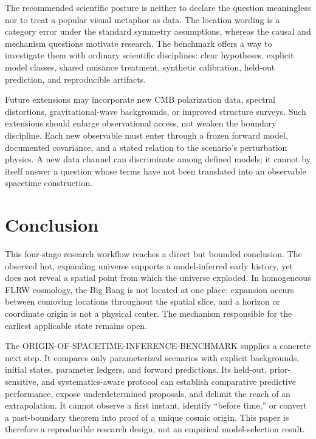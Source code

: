 \documentclass[10pt,conference]{IEEEtran}
\begin{document}
The recommended scientific posture is neither to declare the question meaningless nor to treat a popular visual metaphor as data. The location wording is a category error under the standard symmetry assumptions, whereas the causal and mechanism questions motivate research. The benchmark offers a way to investigate them with ordinary scientific disciplines: clear hypotheses, explicit model classes, shared nuisance treatment, synthetic calibration, held-out prediction, and reproducible artifacts.

Future extensions may incorporate new CMB polarization data, spectral distortions, gravitational-wave backgrounds, or improved structure surveys. Such extensions should enlarge observational access, not weaken the boundary discipline. Each new observable must enter through a frozen forward model, documented covariance, and a stated relation to the scenario's perturbation physics. A new data channel can discriminate among defined models; it cannot by itself answer a question whose terms have not been translated into an observable spacetime construction.

\section{Conclusion}
\label{sec:conclusion}

This four-stage research workflow reaches a direct but bounded conclusion. The observed hot, expanding universe supports a model-inferred early history, yet does not reveal a spatial point from which the universe exploded. In homogeneous FLRW cosmology, the Big Bang is not located at one place: expansion occurs between comoving locations throughout the spatial slice, and a horizon or coordinate origin is not a physical center. The mechanism responsible for the earliest applicable state remains open.

The ORIGIN-OF-SPACETIME-INFERENCE-BENCHMARK supplies a concrete next step. It compares only parameterized scenarios with explicit backgrounds, initial states, parameter ledgers, and forward predictions. Its held-out, prior-sensitive, and systematics-aware protocol can establish comparative predictive performance, expose underdetermined proposals, and delimit the reach of an extrapolation. It cannot observe a first instant, identify ``before time,'' or convert a past-boundary theorem into proof of a unique cosmic origin. This paper is therefore a reproducible research design, not an empirical model-selection result.

\appendices
\end{document}
